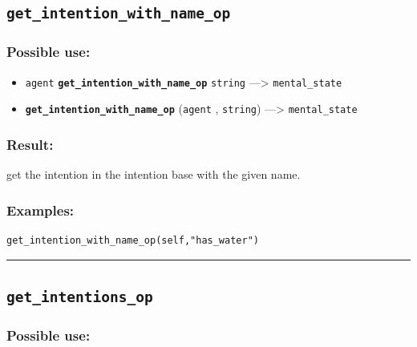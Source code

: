 \documentclass[]{book}
\providecommand{\tightlist}{%
  \setlength{\itemsep}{0pt}\setlength{\parskip}{0pt}}
\theoremstyle{definition}
\theoremstyle{definition}
\theoremstyle{definition}
\theoremstyle{remark}
\begin{document}
\subsection{\texorpdfstring{\texttt{get\_intention\_with\_name\_op}}{get\_intention\_with\_name\_op}}\label{get_intention_with_name_op}

\subsubsection{Possible use:}\label{possible-use-215}

\begin{itemize}
\tightlist
\item
  \texttt{agent} \textbf{\texttt{get\_intention\_with\_name\_op}}
  \texttt{string} ---\textgreater{} \texttt{mental\_state}
\item
  \textbf{\texttt{get\_intention\_with\_name\_op}} (\texttt{agent} ,
  \texttt{string}) ---\textgreater{} \texttt{mental\_state}
\end{itemize}

\subsubsection{Result:}\label{result-209}

get the intention in the intention base with the given name.

\subsubsection{Examples:}\label{examples-162}

\begin{verbatim}
get_intention_with_name_op(self,"has_water") 
\end{verbatim}

\begin{center}\rule{0.5\linewidth}{\linethickness}\end{center}

\subsection{\texorpdfstring{\texttt{get\_intentions\_op}}{get\_intentions\_op}}\label{get_intentions_op}

\subsubsection{Possible use:}\label{possible-use-216}
\end{document}
